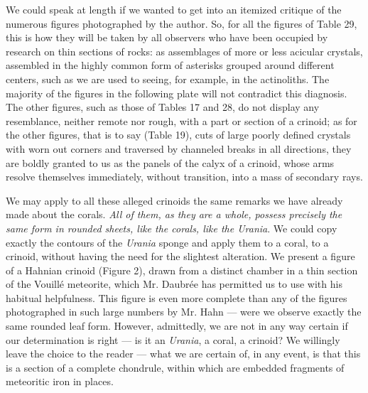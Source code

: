 \documentclass[a4paper, 12pt, oneside]{article}
\begin{document}
We could speak at length if we wanted to get into an itemized critique of the numerous figures photographed by the author. So, for all the figures of Table 29, this is how they will be taken by all observers who have been occupied by research on thin sections of rocks: as assemblages of more or less acicular crystals, assembled in the highly common form of asterisks grouped around different centers, such as we are used to seeing, for example, in the actinoliths. The majority of the figures in the following plate will not contradict this diagnosis. The other figures, such as those of Tables 17 and 28, do not display any resemblance, neither remote nor rough, with a part or section of a crinoid; as for the other figures, that is to say (Table 19), cuts of large poorly defined crystals with worn out corners and traversed by channeled breaks in all directions, they are boldly granted to us as the panels of the calyx of a crinoid, whose arms resolve themselves immediately, without transition, into a mass of secondary rays.

We may apply to all these alleged crinoids the same remarks we have already made about the corals. \emph{All of them, as they are a whole, possess precisely the same form in rounded sheets, like the corals, like the Urania}. We could copy exactly the contours of the \emph{Urania} sponge and apply them to a coral, to a crinoid, without having the need for the slightest alteration. We present a figure of a Hahnian crinoid (Figure 2), drawn from a distinct chamber in a thin section of the Vouillé meteorite, which Mr. Daubrée has permitted us to use with his habitual helpfulness. This figure is even more complete than any of the figures photographed in such large numbers by Mr. Hahn --- were we observe exactly the same rounded leaf form. However, admittedly, we are not in any way certain if our determination is right --- is it an \emph{Urania}, a coral, a crinoid? We willingly leave the choice to the reader --- what we are certain of, in any event, is that this is a section of a complete chondrule, within which are embedded fragments of meteoritic iron in places.
\end{document}
